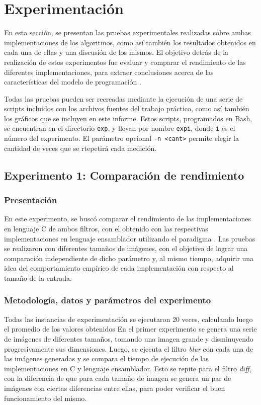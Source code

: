 \section{Experimentación}
    En esta sección, se presentan las pruebas experimentales realizadas sobre ambas implementaciones de los algoritmos, como así también los resultados obtenidos en cada una de ellas y una discusión de los mismos. El objetivo detrás de la realización de estos experimentos fue evaluar y comparar el rendimiento de las diferentes implementaciones, para extraer conclusiones acerca de las características del modelo de programación .

    Todas las pruebas pueden ser recreadas mediante la ejecución de una serie de scripts incluidos con los archivos fuentes del trabajo práctico, como así también los gráficos que se incluyen en este informe. Estos scripts, programados en Bash, se encuentran en el directorio \texttt{exp}, y llevan por nombre \texttt{exp{i}}, donde \texttt{i} es el número del experimento. El parámetro opcional \texttt{-n <cant>} permite elegir la cantidad de veces que se rtepetirá cada medición.

    \subsection{Experimento 1: Comparación de rendimiento}

        \subsubsection*{Presentación}
        	En este experimento, se buscó comparar el rendimiento de las implementaciones en lenguaje C de ambos filtros, con el obtenido con las respectivas implementaciones en lenguaje ensamblador utilizando el paradigma . Las pruebas se realizaron con diferentes tamaños de imágenes, con el objetivo de lograr una comparación independiente de dicho parámetro y, al mismo tiempo, adquirir una idea del comportamiento empírico de cada implementación con respecto al tamaño de la entrada.

        \subsubsection*{Metodología, datos y parámetros del experimento}
        	Todas las instancias de experimentación se ejecutaron 20 veces, calculando luego el promedio de los valores obtenidos
        	En el primer experimento se genera una serie de imágenes de diferentes tamaños, tomando una imagen grande y disminuyendo progresivamente sus dimensiones.
        	Luego, se ejecuta el filtro \emph{blur} con cada una de las imágenes generadas y se compara el tiempo de ejecución de las implementaciones en C y lenguaje ensamblador.
        	Esto se repite para el filtro \emph{diff}, con la diferencia de que para cada tamaño de imagen se genera 
        	un par de imágenes con ciertas diferencias entre ellas, para poder verificar el buen funcionamiento del mismo.


